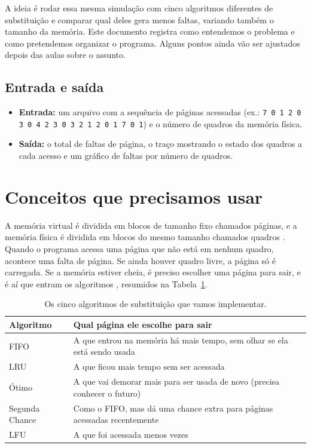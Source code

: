 \documentclass[12pt]{article}
\begin{document}
A ideia é rodar essa mesma simulação com cinco algoritmos diferentes de
substituição e comparar qual deles gera menos faltas, variando também o tamanho
da memória. Este documento registra como entendemos o problema e como
pretendemos organizar o programa. Alguns pontos ainda vão ser ajustados depois
das aulas sobre o assunto.

\subsection{Entrada e saída}
\label{sec:entrada-saida}

\begin{itemize}
    \item \textbf{Entrada:} um arquivo com a sequência de páginas acessadas
    (ex.: \texttt{7 0 1 2 0 3 0 4 2 3 0 3 2 1 2 0 1 7 0 1}) e o número de
    quadros da memória física.
    \item \textbf{Saída:} o total de faltas de página, o traço mostrando o
    estado dos quadros a cada acesso e um gráfico de faltas por número de
    quadros.
\end{itemize}

\section{Conceitos que precisamos usar}
\label{sec:conceitos}

A memória virtual é dividida em blocos de tamanho fixo chamados páginas, e a
memória física é dividida em blocos do mesmo tamanho chamados quadros
\cite{silberschatz2018}. Quando o programa acessa uma página que não está em
nenhum quadro, acontece uma falta de página. Se ainda houver quadro livre, a
página só é carregada. Se a memória estiver cheia, é preciso escolher uma página
para sair, e é aí que entram os algoritmos \cite{tanenbaum2015}, resumidos na
Tabela~\ref{tab:algoritmos}.

\begin{table}[!ht]
\centering
\caption{Os cinco algoritmos de substituição que vamos implementar.}
\label{tab:algoritmos}
\small
\begin{tabular}{p{3.0cm}p{10.2cm}}
\hline
\textbf{Algoritmo} & \textbf{Qual página ele escolhe para sair} \\
\hline
FIFO & A que entrou na memória há mais tempo, sem olhar se ela está sendo usada \\
LRU & A que ficou mais tempo sem ser acessada \\
Ótimo & A que vai demorar mais para ser usada de novo (precisa conhecer o futuro) \\
Segunda Chance & Como o FIFO, mas dá uma chance extra para páginas acessadas recentemente \\
LFU & A que foi acessada menos vezes \\
\hline
\end{tabular}
\end{table}
\end{document}
